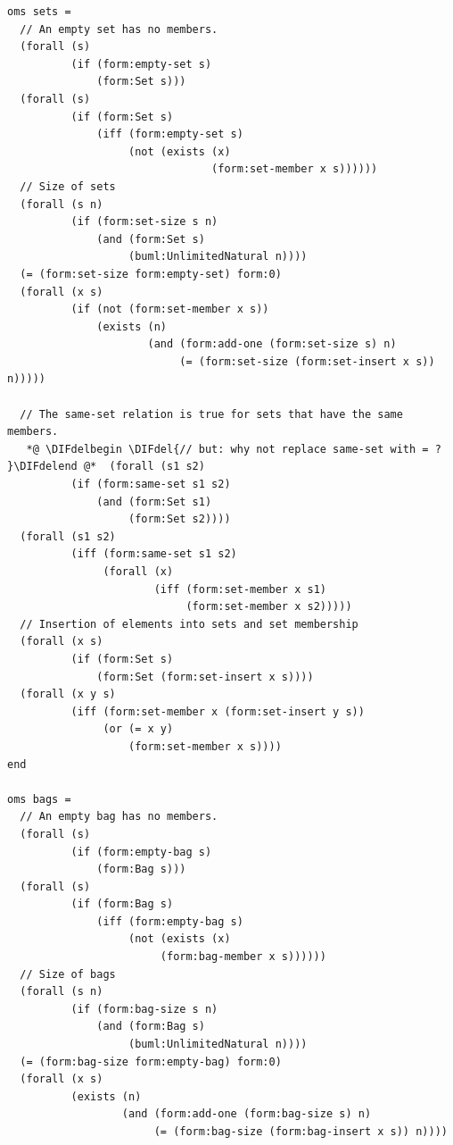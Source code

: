 \documentclass[10pt,fleqn,final]{scrreprt}
\providecommand{\DIFdel}[1]{{\protect\color{red}\sout{#1}}}                      %
\providecommand{\DIFdelbegin}{} %
\providecommand{\DIFdelend}{} %
\begin{document}
\begin{lstlisting}[language=clif,morekeywords={then,with,logic,oms,end},mathescape]
oms sets =
  // An empty set has no members.
  (forall (s)
          (if (form:empty-set s)
              (form:Set s)))
  (forall (s)
          (if (form:Set s)
              (iff (form:empty-set s)
                   (not (exists (x)
                                (form:set-member x s))))))
  // Size of sets
  (forall (s n)
          (if (form:set-size s n)
              (and (form:Set s)
                   (buml:UnlimitedNatural n))))
  (= (form:set-size form:empty-set) form:0)
  (forall (x s)
          (if (not (form:set-member x s))
              (exists (n)
                      (and (form:add-one (form:set-size s) n)
                           (= (form:set-size (form:set-insert x s)) n)))))

  // The same-set relation is true for sets that have the same members.
   *@ \DIFdelbegin \DIFdel{// but: why not replace same-set with = ?
}\DIFdelend @*  (forall (s1 s2)
          (if (form:same-set s1 s2)
              (and (form:Set s1)
                   (form:Set s2))))
  (forall (s1 s2)
          (iff (form:same-set s1 s2)
               (forall (x)
                       (iff (form:set-member x s1)
                            (form:set-member x s2)))))
  // Insertion of elements into sets and set membership
  (forall (x s)
          (if (form:Set s)
              (form:Set (form:set-insert x s))))
  (forall (x y s)
          (iff (form:set-member x (form:set-insert y s))
               (or (= x y)
                   (form:set-member x s))))
end

oms bags =
  // An empty bag has no members.
  (forall (s)
          (if (form:empty-bag s)
              (form:Bag s)))
  (forall (s)
          (if (form:Bag s)
              (iff (form:empty-bag s)
                   (not (exists (x)
                        (form:bag-member x s))))))
  // Size of bags
  (forall (s n)
          (if (form:bag-size s n)
              (and (form:Bag s)
                   (buml:UnlimitedNatural n))))
  (= (form:bag-size form:empty-bag) form:0)
  (forall (x s)
          (exists (n)
                  (and (form:add-one (form:bag-size s) n)
                       (= (form:bag-size (form:bag-insert x s)) n))))


\end{lstlisting}
\end{document}
